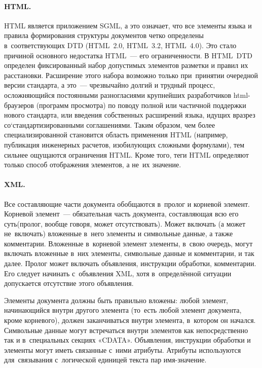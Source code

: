 \documentclass[12pt]{article}
\theoremstyle{definition}
\theoremstyle{remark}
\numberwithin{equation}{section}
\begin{document}
\paragraph{HTML.}
HTML является приложением SGML, а это означает, что все элементы языка
и правила формирования структуры документов четко определены в~соответствующих
DTD (HTML~2.0, HTML~3.2, HTML~4.0). Это стало причиной основного недостатка
HTML~--- его ограниченности. В HTML~DTD определен фиксированный набор
допустимых элементов разметки и правил их расстановки. Расширение этого
набора возможно только при~принятии очередной версии стандарта, а
это~--- чрезвычайно долгий и трудный процесс, осложняющийся постоянными
разногласиями крупнейших разработчиков html-браузеров (программ просмотра)
по поводу полной или частичной поддержки нового стандарта, или введения
собственных расширений языка, идущих вразрез со`стандартизированными
соглашениями. Таким образом, чем более специализированной становится
область применения HTML (например, публикация инженерных расчетов,
изобилующих сложными формулами), тем сильнее ощущаются ограничения HTML.
Кроме того, теги HTML определяют только способ отображения элементов,
а не~их значение.

\paragraph{XML.} Все составляющие части документа обобщаются в~пролог
и корневой элемент. Корневой элемент~--- обязательная часть документа,
составляющая всю его суть(пролог, вообще говоря, может отсутствовать).
Может включать (а может не~включать) вложенные в~него элементы и
символьные данные, а также комментарии. Вложенные в~корневой элемент
элементы, в~свою очередь, могут включать вложенные в~них элементы,
символьные данные и комментарии, и так далее. Пролог может включать
объявления, инструкции обработки, комментарии. Его следует начинать
с~объявления XML, хотя в~определённой ситуации допускается отсутствие
этого объявления.

Элементы документа должны быть правильно вложены: любой элемент,
начинающийся внутри другого элемента (то~есть любой элемент документа,
кроме корневого), должен заканчиваться внутри элемента, в~котором
он начался. Символьные данные могут встречаться внутри элементов
как непосредственно так и в~специальных секциях «CDATA». Объявления,
инструкции обработки и элементы могут иметь связанные с~ними атрибуты.
Атрибуты используются для~связывания с~логической единицей текста
пар имя-значение.
\end{document}

